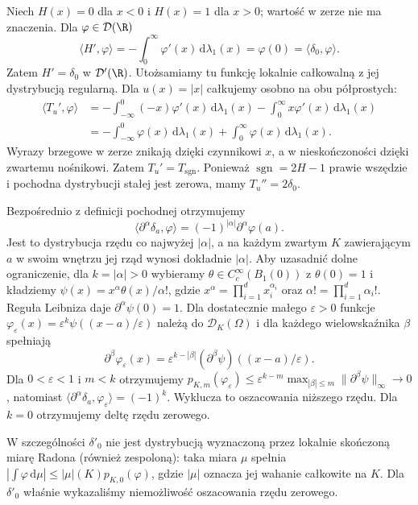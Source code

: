 \begin{przyklad}
\label{ex:pde7-heaviside}
Niech $H(x)=0$ dla $x<0$ i $H(x)=1$ dla $x>0$;
wartość w zerze nie ma znaczenia. Dla $\varphi\in\mathcal D(\R)$
\[
 \langle H',\varphi\rangle
 =-\int_0^\infty\varphi'(x)\,\mathrm d\lambda_1(x)
 =\varphi(0)=\langle\delta_0,\varphi\rangle.
\]
Zatem $H'=\delta_0$ w $\mathcal D'(\R)$.
Utożsamiamy tu funkcję lokalnie całkowalną z jej
dystrybucją regularną. Dla $u(x)=|x|$ całkujemy osobno
na obu półprostych:
\[
 \begin{aligned}
 \langle T_u',\varphi\rangle
 &=-\int_{-\infty}^0(-x)\varphi'(x)\,\mathrm d\lambda_1(x)
   -\int_0^\infty x\varphi'(x)\,\mathrm d\lambda_1(x)\\
 &=-\int_{-\infty}^0\varphi(x)\,\mathrm d\lambda_1(x)
   +\int_0^\infty\varphi(x)\,\mathrm d\lambda_1(x).
 \end{aligned}
\]
Wyrazy brzegowe w zerze znikają dzięki czynnikowi $x$,
a w nieskończoności dzięki zwartemu nośnikowi.
Zatem $T_u'=T_{\operatorname{sgn}}$. Ponieważ
$\operatorname{sgn}=2H-1$ prawie wszędzie i pochodna
dystrybucji stałej jest zerowa, mamy $T_u''=2\delta_0$.
\end{przyklad}

\begin{przyklad}
Bezpośrednio z definicji pochodnej otrzymujemy
\[
 \langle\partial^\alpha\delta_a,\varphi\rangle
 =(-1)^{|\alpha|}\partial^\alpha\varphi(a).
\]
Jest to dystrybucja rzędu co najwyżej $|\alpha|$,
a na każdym zwartym $K$ zawierającym $a$ w swoim
wnętrzu jej rząd wynosi dokładnie $|\alpha|$.
Aby uzasadnić dolne ograniczenie, dla $k=|\alpha|>0$
wybieramy $\theta\in C_c^\infty(B_1(0))$ z $\theta(0)=1$
i kładziemy $\psi(x)=x^\alpha\theta(x)/\alpha!$,
gdzie $x^\alpha=\prod_{i=1}^d x_i^{\alpha_i}$ oraz
$\alpha!=\prod_{i=1}^d\alpha_i!$.
Reguła Leibniza daje $\partial^\alpha\psi(0)=1$.
Dla dostatecznie małego $\varepsilon>0$ funkcje
$\varphi_\varepsilon(x)=\varepsilon^k
\psi((x-a)/\varepsilon)$ należą do $\mathcal D_K(\Omega)$
i dla każdego wielowskaźnika $\beta$ spełniają
\[
 \partial^\beta\varphi_\varepsilon(x)
 =\varepsilon^{k-|\beta|}
 (\partial^\beta\psi)((x-a)/\varepsilon).
\]
Dla $0<\varepsilon<1$ i $m<k$ otrzymujemy
$p_{K,m}(\varphi_\varepsilon)\le
\varepsilon^{k-m}\max_{|\beta|\le m}
\|\partial^\beta\psi\|_\infty\to0$, natomiast
$\langle\partial^\alpha\delta_a,\varphi_\varepsilon\rangle
=(-1)^k$. Wyklucza to oszacowania niższego rzędu.
Dla $k=0$ otrzymujemy deltę rzędu zerowego.

W szczególności $\delta'_0$ nie jest dystrybucją
wyznaczoną przez lokalnie skończoną miarę Radona
(również zespoloną): taka miara $\mu$ spełnia
$|\int\varphi\,\mathrm d\mu|\le|\mu|(K)p_{K,0}(\varphi)$,
gdzie $|\mu|$ oznacza jej wahanie całkowite na $K$.
Dla $\delta'_0$ właśnie wykazaliśmy niemożliwość
oszacowania rzędu zerowego.
\end{przyklad}

